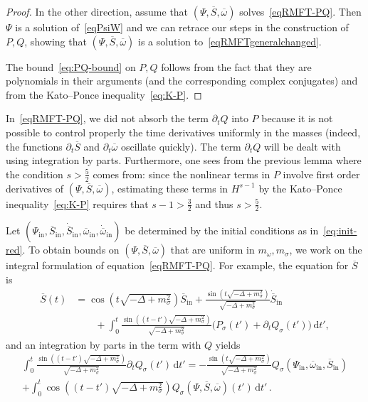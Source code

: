 \documentclass[AHL,Unicode,longabstracts,published]{cedram}
\newcommand{\rmin}{\mathrm{in}}
\renewcommand\bar{\overline}
\renewcommand\d[1]{{\ensuremath{\,\text{d}#1}}}
\begin{document}
\begin{proof}
In the other direction, assume that $(\Psi,\overline{S}, \overline{\omega})$ solves~\eqref{eqRMFT-PQ}. Then $\Psi$ is a solution of~\eqref{eqPsiW} and we can retrace our steps in the construction of $P,Q$, showing that $(\Psi,\overline{S}, \overline{\omega})$ is a solution to~\eqref{eqRMFTgeneralchanged}.

The bound~\eqref{eq:PQ-bound} on $P,Q$ follows from the fact that they are polynomials in their arguments (and the corresponding complex conjugates) and from the Kato--Ponce inequality~\eqref{eq:K-P}.
\end{proof}

\begin{rema}
In~\eqref{eqRMFT-PQ}, we did not absorb the term $\partial_t Q$ into $P$ because it is not possible to control properly the time derivatives uniformly in the masses (indeed, the functions $\partial_t \bar{S}$ and $\partial_t \bar{\omega}$ oscillate quickly). The term $\partial_t Q$ will be dealt with using integration by parts. Furthermore, one sees from the previous lemma where the condition $s>\tfrac52$ comes from: since the nonlinear terms in $P$ involve first order derivatives of $(\Psi,\bar{S},\bar{\omega})$, estimating these terms in $H^{s-1}$ by the Kato--Ponce inequality~\eqref{eq:K-P} requires that $s-1>\tfrac32$ and thus $s>\tfrac52$.
\end{rema}

Let $(\Psi_\rmin, \overline{S}_\rmin, \dot{\overline{S}}_\rmin, \overline{\omega}_\rmin, \dot{\overline{\omega}}_\rmin)$ be determined by the initial conditions as in~\eqref{eq:init-red}. To obtain bounds on $(\Psi,\bar{S},\bar{\omega})$ that are uniform in $m_\omega, m_\sigma$, we work on the integral formulation of equation~\eqref{eqRMFT-PQ}. For example, the equation for $\overline{S}$ is
\begin{align*}
\overline{S}(t)&=\cos\left(t\sqrt{-\Delta + m_\sigma^2}\right)\overline{S}_\rmin +
\frac{\sin\left(t\sqrt{-\Delta + m_\sigma^2}\right)}{\sqrt{-\Delta + m_\sigma^2}}\dot{\overline{S}}_\rmin \\
& \qquad+
\int_0^t
\frac{\sin\left((t-t')\sqrt{-\Delta + m_\sigma^2}\right)}{\sqrt{-\Delta + m_\sigma^2}}\big(P_\sigma(t')+\partial_t Q_\sigma(t')\big)\d t',
\end{align*}
and an integration by parts in the term with $Q$ yields
\begin{multline*}
\int_0^t \frac{\sin\left((t-t')\sqrt{-\Delta + m_\sigma^2}\right)}{\sqrt{-\Delta + m_\sigma^2}}\partial_t Q_\sigma(t')\d t' 
= - \frac{\sin\left(t\sqrt{-\Delta + m_\sigma^2}\right) }{\sqrt{-\Delta + m_\sigma^2}} Q_\sigma\left(\Psi_\rmin, \overline{\omega}_\rmin, \overline{S}_\rmin\right)\\ +\int_0^t \cos\left((t-t')\sqrt{-\Delta+ m_\sigma^2}\right)Q_\sigma\left(\Psi, \overline{S}, \overline{\omega}\right)(t')\d t' \,.
\end{multline*}
\end{document}
